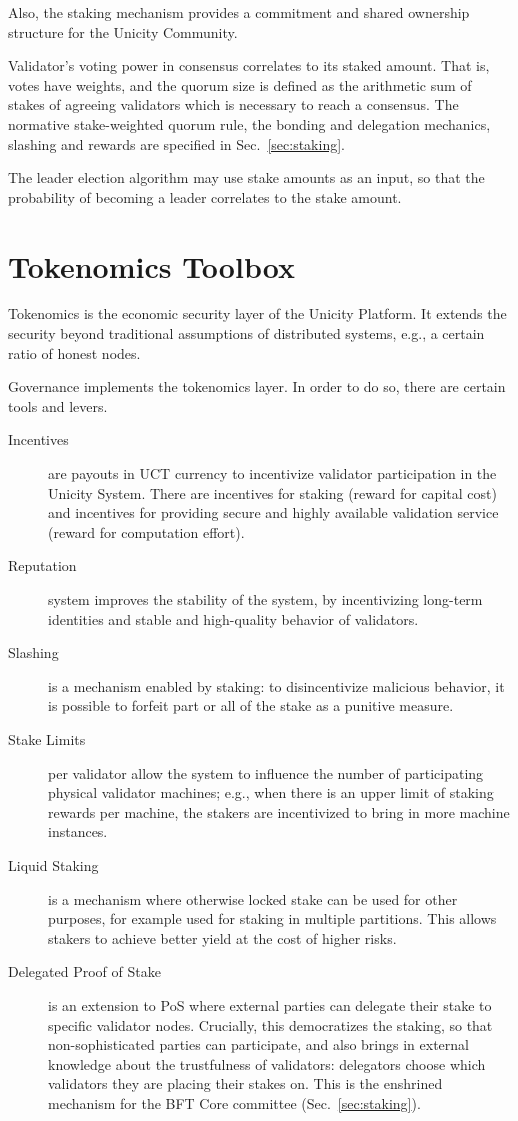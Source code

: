 Also, the staking mechanism provides a commitment and shared ownership structure for the Unicity Community.

Validator's voting power in consensus correlates to its staked amount. That is, votes have weights, and the quorum size is defined as the arithmetic sum of stakes of agreeing validators which is necessary to reach a consensus. The normative stake-weighted quorum rule, the bonding and delegation mechanics, slashing and rewards are specified in Sec.~\ref{sec:staking}.

The leader election algorithm may use stake amounts as an input, so that the probability of becoming a leader correlates to the stake amount.

\section{Tokenomics Toolbox}

Tokenomics is the economic security layer of the Unicity Platform. It extends the security beyond traditional assumptions of distributed systems, e.g., a certain ratio of honest nodes.

Governance implements the tokenomics layer. In order to do so, there are certain tools and levers.

\begin{description}
	\item[Incentives] are payouts in UCT currency to incentivize validator participation in the Unicity System. There are incentives for staking (reward for capital cost) and incentives for providing secure and highly available validation service (reward for computation effort).
	\item[Reputation] system improves the stability of the system, by incentivizing long-term identities and stable and high-quality behavior of validators.
	\item[Slashing] is a mechanism enabled by staking: to disincentivize malicious behavior, it is possible to forfeit part or all of the stake as a punitive measure.
	\item[Stake Limits] per validator allow the system to influence the number of participating physical validator machines; e.g., when there is an upper limit of staking rewards per machine, the stakers are incentivized to bring in more machine instances.
	\item[Liquid Staking] is a mechanism where otherwise locked stake can be used for other purposes, for example used for staking in multiple partitions. This allows stakers to achieve better yield at the cost of higher risks.
	\item[Delegated Proof of Stake] is an extension to PoS where external parties can delegate their stake to specific validator nodes. Crucially, this democratizes the staking, so that non-sophisticated parties can participate, and also brings in external knowledge about the trustfulness of validators: delegators choose which validators they are placing their stakes on. This is the enshrined mechanism for the BFT Core committee (Sec.~\ref{sec:staking}).
\end{description}


